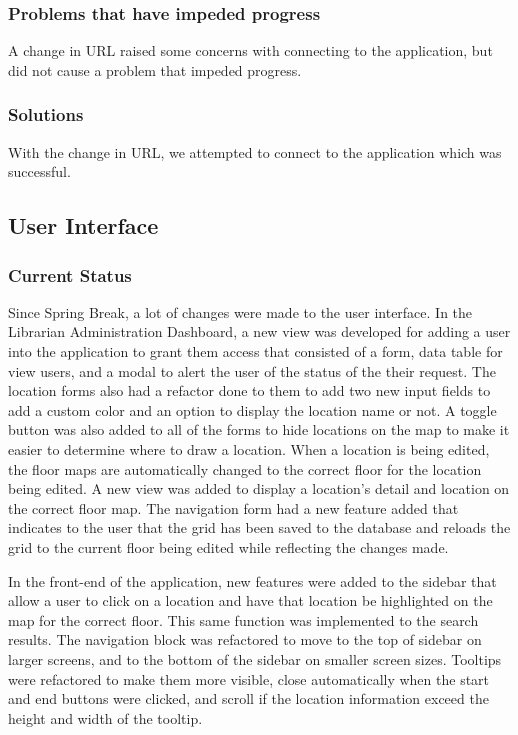 \documentclass[letterpaper,10pt,serif,titlepage, onecolumn, compsoc]{IEEEtran}
\begin{document}
\subsubsection{Problems that have impeded progress}
A change in URL raised some concerns with connecting to the application, but did not cause a problem that impeded progress.


\subsubsection{Solutions}
With the change in URL, we attempted to connect to the application which was successful. 

\subsection{User Interface}
\subsubsection{Current Status}
Since Spring Break, a lot of changes were made to the user interface. In the Librarian Administration Dashboard, a new view was developed for adding a user into the application to grant them access that consisted of a form, data table for view users, and a modal to alert the user of the status of the their request. The location forms also had a refactor done to them to add two new input fields to add a custom color and an option to display the location name or not. A toggle button was also added to all of the forms to hide locations on the map to make it easier to determine where to draw a location. When a location is being edited, the floor maps are automatically changed to the correct floor for the location being edited. A new view was added to display a location’s detail and location on the correct floor map. The navigation form had a new feature added that indicates to the user that the grid has been saved to the database and reloads the grid to the current floor being edited while reflecting the changes made.

In the front-end of the application, new features were added to the sidebar that allow a user to click on a location and have that location be highlighted on the map for the correct floor. This same function was implemented to the search results. The navigation block was refactored to move to the top of sidebar on larger screens, and to the bottom of the sidebar on smaller screen sizes. Tooltips were refactored to make them more visible, close automatically when the start and end buttons were clicked, and scroll if the location information exceed the height and width of the tooltip. 
\end{document}

